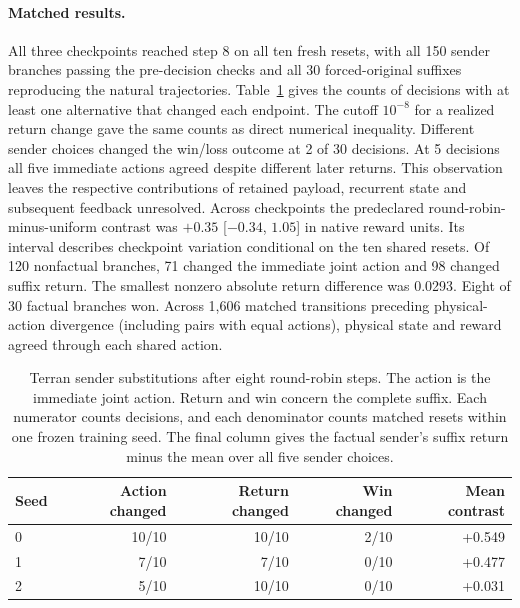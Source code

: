 \documentclass[pdflatex,sn-mathphys-num]{sn-jnl}
\begin{document}
\paragraph{Matched results.} All three checkpoints reached step 8 on all ten fresh resets, with all 150 sender branches passing the pre-decision checks and all 30 forced-original suffixes reproducing the natural trajectories. Table~\ref{tab:terran-branch-seeds} gives the counts of decisions with at least one alternative that changed each endpoint. The cutoff $10^{-8}$ for a realized return change gave the same counts as direct numerical inequality. Different sender choices changed the win/loss outcome at 2 of 30 decisions. At 5 decisions all five immediate actions agreed despite different later returns. This observation leaves the respective contributions of retained payload, recurrent state and subsequent feedback unresolved. Across checkpoints the predeclared round-robin-minus-uniform contrast was $+0.35$ [$-0.34$, $1.05$] in native reward units. Its interval describes checkpoint variation conditional on the ten shared resets. Of 120 nonfactual branches, 71 changed the immediate joint action and 98 changed suffix return. The smallest nonzero absolute return difference was 0.0293. Eight of 30 factual branches won. Across 1,606 matched transitions preceding physical-action divergence (including pairs with equal actions), physical state and reward agreed through each shared action.

\begin{table}[htbp]\centering
\caption{Terran sender substitutions after eight round-robin steps. The action is the immediate joint action. Return and win concern the complete suffix. Each numerator counts decisions, and each denominator counts matched resets within one frozen training seed. The final column gives the factual sender's suffix return minus the mean over all five sender choices.}\label{tab:terran-branch-seeds}
\begin{tabular}{@{}lrrrr@{}}\toprule
Seed & Action changed & Return changed & Win changed & Mean contrast\\\midrule
0 & 10/10 & 10/10 & 2/10 & +0.549\\
1 & 7/10 & 7/10 & 0/10 & +0.477\\
2 & 5/10 & 10/10 & 0/10 & +0.031\\
\bottomrule\end{tabular}
\end{table}
\end{document}
